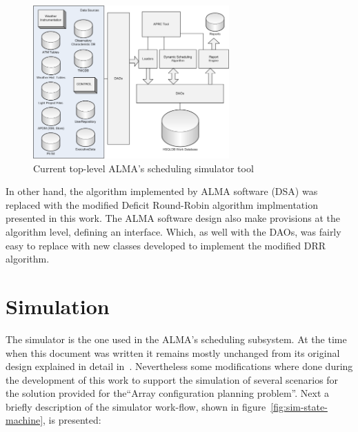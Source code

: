 \begin{figure}[h!]	
\begin{center}
\includegraphics[width=0.67\textwidth]{images/simulator-arch}
\end{center}
\caption{Current top-level ALMA's scheduling simulator tool}
\label{fig:sim-top-level-architecture}
\end{figure}

In other hand, the algorithm implemented by ALMA software (DSA) was replaced with the modified Deficit Round-Robin algorithm implmentation presented in this work. The ALMA software design also make provisions at the algorithm level, defining an interface. Which, as well with the DAOs, was fairly easy to replace with new classes developed to implement the modified DRR algorithm.

\section {Simulation}
The simulator is the one used in the ALMA's scheduling subsystem. At the time when this document was written it remains mostly unchanged from its original design explained in detail in~\cite{hoffstadt10}. Nevertheless some modifications where done during the development of this work to support the simulation of several scenarios for the solution provided for the``Array configuration planning problem''. Next a briefly description of the simulator work-flow, shown in figure~\ref{fig:sim-state-machine}, is presented:

